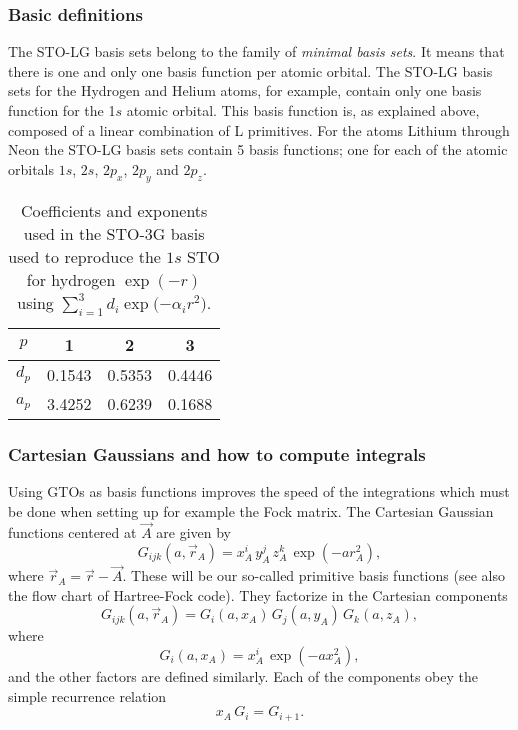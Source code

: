 {
  \frametitle{Basic definitions}
\begin{small}
{\scriptsize
The STO-LG basis sets belong to the family of \emph{minimal basis sets}.
It means that there is one and only one basis function per atomic orbital.
The STO-LG basis sets for the Hydrogen and Helium atoms, for example, contain only one basis
function for the 1$s$ atomic orbital. This basis function is, as explained above, composed of
a linear combination of L primitives. For the atoms Lithium through Neon the STO-LG basis
sets contain 5 basis functions; one for each of the atomic orbitals
$1s$, $2s$, $2p_x$, $2p_y$ and $2p_z$.

\begin{table}
 \begin{center}
 \caption{Coefficients and exponents used in the STO-3G basis used to reproduce the $1s$ STO for hydrogen $\exp{(-r)}$ using
$\sum_{i=1}^3d_i\exp{(-\alpha_ir^2})$.}
 \label{tab:STO3G}
  \begin{tabular}{|c|c|c|c|}\hline
   $p$        &  1  &  2  &   3 \\ \hline
   $d_p$      &  0.1543   & 0.5353    & 0.4446  \\ \hline
   $a_p$ &  3.4252   & 0.6239    & 0.1688  \\ \hline
  \end{tabular}
 \end{center}
\end{table}


}
\end{small}
}
\frame
{
  \frametitle{Cartesian Gaussians and how to compute integrals}
\begin{small}
{\scriptsize
Using GTOs as basis functions improves the speed of the integrations which must be done when setting up 
for example the Fock matrix.
The Cartesian Gaussian functions centered at $\vec A$ are given by
\begin{equation}
 G_{ijk}(a, \vec r_A) = x^i_A\,y^j_A\,z^k_A\,\exp(-a r^2_A),
\end{equation}
where $\vec r_A = \vec r - \vec A$. These will be our so-called primitive basis functions (see also the flow chart of Hartree-Fock code). 
They factorize in the Cartesian components
\begin{equation}
 G_{ijk}(a, \vec r_A) = G_i(a, x_A)\,G_j(a, y_A)\,G_k(a, z_A),
\end{equation}
where
\begin{equation}
 G_i(a, x_A) = x^i_A\,\exp(-a x^2_A),
\end{equation}
and the other factors are defined similarly. Each of the components obey the simple recurrence relation
\begin{equation}
 x_A\,G_i = G_{i+1}.
\end{equation}
}
\end{small}
}
